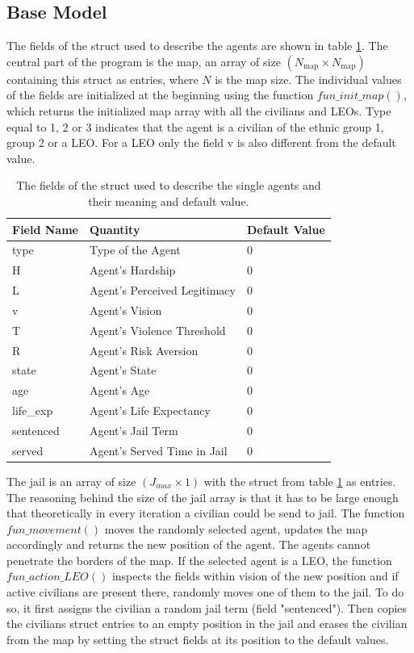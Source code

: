 \documentclass[11pt]{article}
\begin{document}
\subsection{Base Model}
The fields of the struct used to describe the agents are shown in table \ref{tab:fields_struct}. The central part of the program is the map, an array of size $(N_{\text{map}} \times N_{\text{map}})$ containing this struct as entries, where $N$ is the map size. The individual values of the fields are initialized at the beginning using the function $fun\_init\_map()$, which returns the initialized map array with all the civilians and LEOs. Type equal to 1, 2 or 3 indicates that the agent is a civilian of the ethnic group 1, group 2 or a LEO. For a LEO only the field v is also different from the default value.
\begin{table}[!htbp]
	\centering
	\caption{The fields of the struct used to describe the single agents and their meaning and default value.}
	\vspace{0.5 cm}
		\begin{tabular}{l | l | l} 
			Field Name & Quantity & Default Value\\
			\hline
			type & Type of the Agent & 0\\
			H & Agent's Hardship & 0\\
			L & Agent's Perceived Legitimacy & 0\\
			v & Agent's Vision & 0\\
			T & Agent's Violence Threshold & 0\\
			R & Agent's Risk Aversion & 0\\
			state & Agent's State & 0\\
			age & Agent's Age & 0\\
			life\_exp & Agent's Life Expectancy & 0\\
			sentenced & Agent's Jail Term & 0\\
			served & Agent's Served Time in Jail & 0
	\end{tabular}
	\label{tab:fields_struct}
\end{table}
The jail is an array of size $(J_{max} \times 1)$ with the struct from table \ref{tab:fields_struct} as entries. The reasoning behind the size of the jail array is that it has to be large enough that theoretically in every iteration a civilian could be send to jail. The function $fun\_movement()$ moves the randomly selected agent, updates the map accordingly and returns the new position of the agent. The agents cannot penetrate the borders of the map. If the selected agent is a LEO, the function $fun\_action\_LEO()$ inspects the fields within vision of the new position and if active civilians are present there, randomly moves one of them to the jail. To do so, it first assigns the civilian a random jail term (field "sentenced"). Then copies the civilians struct entries to an empty position in the jail and erases the civilian from the map by setting the struct fields at its position to the default values.\\
\end{document}
